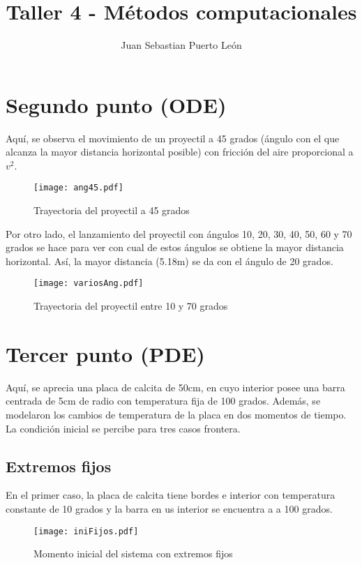 \documentclass[letterpaper,12pt]{article}
\title{Taller 4 - Métodos computacionales}
\author{Juan Sebastian Puerto León}
\date{}
\begin{document}
\maketitle

\section*{Segundo punto (ODE)}

Aquí, se observa el movimiento de un proyectil a 45 grados (ángulo con el que alcanza la mayor distancia horizontal posible) con fricción del aire proporcional a $v^2$.

\begin{figure}[h!]
	\centering
	\caption{Trayectoria del proyectil a 45 grados}
	\texttt{[image: ang45.pdf]}
\end{figure}

Por otro lado, el lanzamiento del proyectil con ángulos 10, 20, 30, 40, 50, 60 y 70 grados se hace para ver con cual de estos ángulos se obtiene la mayor distancia horizontal. Así, la mayor distancia (5.18m) se da con el ángulo de 20 grados.

\begin{figure}[h!]
	\centering
	\caption{Trayectoria del proyectil entre 10 y 70 grados}
	\texttt{[image: variosAng.pdf]}
\end{figure}

\section*{Tercer punto (PDE)}

Aquí, se aprecia una placa de calcita de 50cm, en cuyo interior posee una barra centrada de 5cm de radio con temperatura fija de 100 grados. Además, se modelaron los cambios de temperatura de la placa en dos momentos de tiempo. La condición inicial se percibe para tres casos frontera.

\subsection*{Extremos fijos}

En el primer caso, la placa de calcita tiene bordes e interior con temperatura constante de 10 grados y la barra en us interior se encuentra a a 100 grados.

\begin{figure}[h!]
	\centering
	\caption{Momento inicial del sistema con extremos fijos}
	\texttt{[image: iniFijos.pdf]}
\end{figure}
\end{document}
